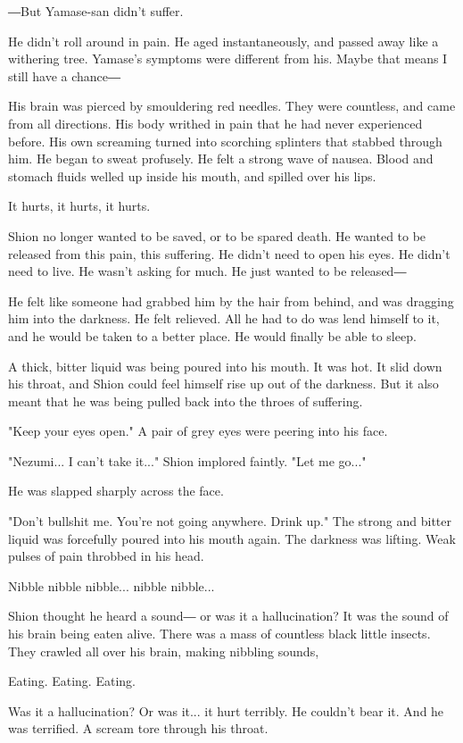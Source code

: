―But Yamase-san didn't suffer.

He didn't roll around in pain. He aged instantaneously, and passed away
like a withering tree. Yamase's symptoms were different from his. Maybe
that means I still have a chance―

His brain was pierced by smouldering red needles. They were countless,
and came from all directions. His body writhed in pain that he had never
experienced before. His own screaming turned into scorching splinters
that stabbed through him. He began to sweat profusely. He felt a strong
wave of nausea. Blood and stomach fluids welled up inside his mouth, and
spilled over his lips.

It hurts, it hurts, it hurts.

Shion no longer wanted to be saved, or to be spared death. He wanted to
be released from this pain, this suffering. He didn't need to open his
eyes. He didn't need to live. He wasn't asking for much. He just wanted
to be released―

He felt like someone had grabbed him by the hair from behind, and was
dragging him into the darkness. He felt relieved. All he had to do was
lend himself to it, and he would be taken to a better place. He would
finally be able to sleep.

A thick, bitter liquid was being poured into his mouth. It was hot. It
slid down his throat, and Shion could feel himself rise up out of the
darkness. But it also meant that he was being pulled back into the
throes of suffering.

"Keep your eyes open." A pair of grey eyes were peering into his face.

"Nezumi... I can't take it..." Shion implored faintly. "Let me go..."

He was slapped sharply across the face.

"Don't bullshit me. You're not going anywhere. Drink up." The strong and
bitter liquid was forcefully poured into his mouth again. The darkness
was lifting. Weak pulses of pain throbbed in his head.

Nibble nibble nibble... nibble nibble...

Shion thought he heard a sound― or was it a hallucination? It was the
sound of his brain being eaten alive. There was a mass of countless
black little insects. They crawled all over his brain, making nibbling
sounds,

Eating. Eating. Eating.

Was it a hallucination? Or was it... it hurt terribly. He couldn't bear
it. And he was terrified. A scream tore through his throat.


